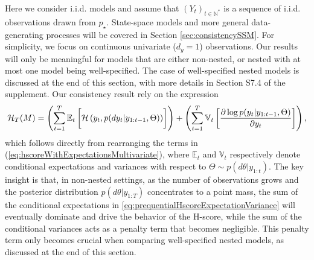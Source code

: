 \documentclass[12pt]{article}
\theoremstyle{plain}
\theoremstyle{definition}
\newcommand{\suppheuristicnested}{ S7.4 }
\begin{document}
	Here we consider i.i.d.\! models and assume that $(Y_t)_{t\in\mathbb{N}^*}$ is
	a sequence of i.i.d.\! observations drawn from $p_\star$. State-space models
	and more general data-generating processes will be covered in Section
	\ref{sec:consistencySSM}. For simplicity, we focus on continuous univariate ($d_y = 1$) observations.  
	Our results will only be meaningful for models that are either non-nested, or nested with at
	most one model being well-specified. The case of well-specified nested models
	is discussed at the end of this section, with more details in Section\suppheuristicnested of the supplement.
	Our consistency result rely on the expression
	\begin{align}
	\mathcal{H}_{T}(M) = \left(\sum_{t=1}^T \mathbb{E}_t\left[\vphantom{\frac{\partial \log p(y_t|y_{1:t-1},\Theta)}{\partial y_t}}\mathcal{H}\left(y_t,p(dy_t|y_{1:t-1},\Theta)\right)\right]\right) + \left(\sum_{t=1}^T \mathbb{V}_t\left[\frac{\partial \log p(y_t|y_{1:t-1},\Theta)}{\partial y_t}\right]\right),
	\label{eq:prequentialHscoreExpectationVariance}
	\end{align}
	which follows directly from rearranging the terms in
	(\ref{eq:hscoreWithExpectationsMultivariate}), where $\mathbb{E}_t$ and $\mathbb{V}_t$ respectively denote conditional expectations and variances with respect to $\Theta\sim p(d\theta|y_{1:t})$. The key insight is that, in non-nested settings, as the
	number of observations grows and the posterior distribution
	$p(d\theta|y_{1:T})$ concentrates to a point mass, the sum of the conditional
	expectations in \eqref{eq:prequentialHscoreExpectationVariance} will eventually dominate and drive the behavior of the 
	H-score, while the sum of the conditional variances acts as a
	penalty term that becomes negligible. This penalty term only becomes crucial when comparing well-specified nested models,
	as discussed at the end of this section. 
	
\end{document}
